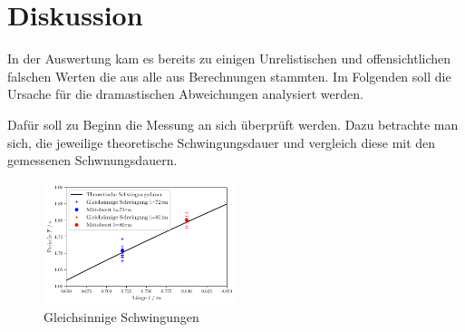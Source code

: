\section{Diskussion}
\label{sec:Diskussion}

In der Auswertung kam es bereits zu einigen Unrelistischen und offensichtlichen
falschen Werten die aus alle aus Berechnungen stammten.
Im Folgenden soll die Ursache für die dramastischen Abweichungen analysiert werden.


Dafür soll zu Beginn die Messung an sich überprüft werden.
Dazu betrachte man sich, die jeweilige theoretische Schwingungsdauer und 
vergleich diese mit den gemessenen Schwnungsdauern.
\begin{figure}
    \centering
    \includegraphics[width=0.5\textwidth]{plots/plot1.pdf}
    \caption{Gleichsinnige Schwingungen}
\end{figure}

